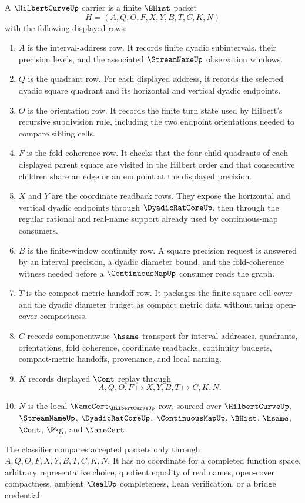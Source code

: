 \begin{definition}
\label{def:hilbert-curve-carrier}
A $\HilbertCurveUp$ carrier is a finite $\BHist$ packet
$$
H=(A,Q,O,F,X,Y,B,T,C,K,N)
$$
with the following displayed rows:
\begin{enumerate}
\item $A$ is the interval-address row. It records finite dyadic subintervals, their precision levels, and the associated $\StreamNameUp$ observation windows.
\item $Q$ is the quadrant row. For each displayed address, it records the selected dyadic square quadrant and its horizontal and vertical dyadic endpoints.
\item $O$ is the orientation row. It records the finite turn state used by Hilbert's recursive subdivision rule, including the two endpoint orientations needed to compare sibling cells.
\item $F$ is the fold-coherence row. It checks that the four child quadrants of each displayed parent square are visited in the Hilbert order and that consecutive children share an edge or an endpoint at the displayed precision.
\item $X$ and $Y$ are the coordinate readback rows. They expose the horizontal and vertical dyadic endpoints through $\DyadicRatCoreUp$, then through the regular rational and real-name support already used by continuous-map consumers.
\item $B$ is the finite-window continuity row. A square precision request is answered by an interval precision, a dyadic diameter bound, and the fold-coherence witness needed before a $\ContinuousMapUp$ consumer reads the graph.
\item $T$ is the compact-metric handoff row. It packages the finite square-cell cover and the dyadic diameter budget as compact metric data without using open-cover compactness.
\item $C$ records componentwise $\hsame$ transport for interval addresses, quadrants, orientations, fold coherence, coordinate readbacks, continuity budgets, compact-metric handoffs, provenance, and local naming.
\item $K$ records displayed $\Cont$ replay through
$$
A,Q,O,F \longmapsto X,Y,B,T \longmapsto C,K,N .
$$
\item $N$ is the local $\NameCert_{\HilbertCurveUp}$ row, sourced over $\HilbertCurveUp$, $\StreamNameUp$, $\DyadicRatCoreUp$, $\ContinuousMapUp$, $\BHist$, $\hsame$, $\Cont$, $\Pkg$, and $\NameCert$.
\end{enumerate}
The classifier compares accepted packets only through $A,Q,O,F,X,Y,B,T,C,K,N$. It has no coordinate for a completed function space, arbitrary representative choice, quotient equality of real names, open-cover compactness, ambient $\RealUp$ completeness, Lean verification, or a bridge credential.
\end{definition}


